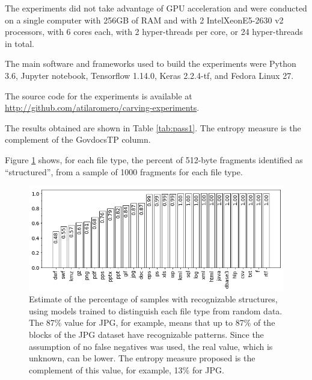 The experiments did not take advantage of GPU acceleration and were  conducted on a single computer with 256GB of RAM and with 2 Intel\textregistered Xeon\textregistered E5-2630 v2 processors, with 6 cores each, with 2 hyper-threads per core, or 24 hyper-threads in total. 


The main software and frameworks used to build the experiments were Python 3.6, Jupyter notebook, Tensorflow 1.14.0, Keras 2.2.4-tf, and Fedora Linux 27.

The source code for the experiments is available at \sloppy\url{http://github.com/atilaromero/carving-experiments}.




The results obtained are shown in Table \ref{tab:pass1}. The entropy measure is the complement of the GovdocsTP column.

Figure \ref{fig:not_random} shows, for each file type, the percent of 512-byte fragments identified as ``structured'', from a sample of 1000 fragments for each file type.

\noindent
\begin{figure}[htb!]
\centering\includegraphics[width=1.0\textwidth]{content/random.png}
\caption[Complement of entropy measure for 28 file types]{\label{fig:not_random}Estimate of the percentage of samples with recognizable structures, using models trained to distinguish each file type from random data. The 87\% value for JPG, for example, means that up to 87\% of the blocks of the JPG dataset have recognizable patterns. Since the assumption of no false negatives was used, the real value, which is unknown, can be lower. The entropy measure proposed is the complement of this value, for example, 13\% for JPG.}%
\end{figure}
